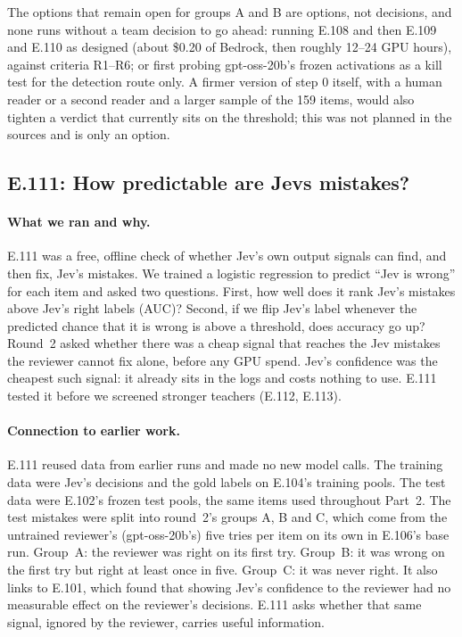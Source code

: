 \documentclass[11pt]{article}
\renewcommand{\_}{\origunderscore\allowbreak}
\begin{document}
The options that remain open for groups A and B are options, not decisions, and none runs without a team decision to go ahead: running E.108 and then E.109 and E.110 as designed (about \$0.20 of Bedrock, then roughly 12--24 GPU hours), against criteria R1--R6; or first probing gpt-oss-20b's frozen activations as a kill test for the detection route only. A firmer version of step 0 itself, with a human reader or a second reader and a larger sample of the 159 items, would also tighten a verdict that currently sits on the threshold; this was not planned in the sources and is only an option.

\subsection{E.111: How predictable are Jev\textquotesingle s mistakes?}\label{sec:e111}

\paragraph{What we ran and why.}
E.111 was a free, offline check of whether Jev's own output signals can find, and then fix, Jev's mistakes. We trained a logistic regression to predict ``Jev is wrong'' for each item and asked two questions. First, how well does it rank Jev's mistakes above Jev's right labels (AUC)? Second, if we flip Jev's label whenever the predicted chance that it is wrong is above a threshold, does accuracy go up? Round~2 asked whether there was a cheap signal that reaches the Jev mistakes the reviewer cannot fix alone, before any GPU spend. Jev's confidence was the cheapest such signal: it already sits in the logs and costs nothing to use. E.111 tested it before we screened stronger teachers (E.112, E.113).

\paragraph{Connection to earlier work.}
E.111 reused data from earlier runs and made no new model calls. The training data were Jev's decisions and the gold labels on E.104's training pools. The test data were E.102's frozen test pools, the same items used throughout Part~2. The test mistakes were split into round~2's groups A, B and C, which come from the untrained reviewer's (gpt-oss-20b's) five tries per item on its own in E.106's base run. Group~A: the reviewer was right on its first try. Group~B: it was wrong on the first try but right at least once in five. Group~C: it was never right. It also links to E.101, which found that showing Jev's confidence to the reviewer had no measurable effect on the reviewer's decisions. E.111 asks whether that same signal, ignored by the reviewer, carries useful information.
\end{document}
